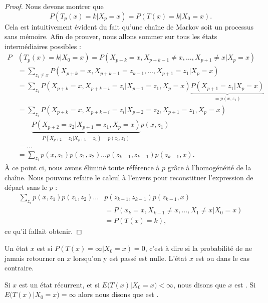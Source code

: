 \begin{proof}
    Nous devons montrer que 
    \begin{equation}
        P(T_p(x)=k|X_p=x)=P(T(x)=k|X_0=x).
    \end{equation}
    Cela est intuitivement évident du fait qu'une chaîne de Markov soit un processus sans mémoire. Afin de prouver, nous allons sommer sur tous les états intermédiaires possibles :
    \begin{subequations}
        \begin{align}
            P&(T_p(x)=k|X_0=x)=P(X_{p+k}=x,X_{p+k-1}\neq x,\ldots,X_{p+1}\neq x|X_p=x)\\
            &=\sum_{z_i\neq x}P(X_{p+k}=x,X_{p+k-1}=z_{k-1},\ldots,X_{p+1}=z_1|X_p=x)\\
            &=\sum_{z_i}P(X_{p+k}=x,X_{p+k-i}=z_i|X_{p+1}=z_1,X_p=x)\underbrace{P(X_{p+1}=z_1|X_p=x)}_{=p(x,z_1)}\\
            &=\sum_{z_i}P(X_{p+k}=x,X_{p+k-i}=z_i|X_{p+2}=z_2,X_{p+1}=z_1,X_p=x)\\
            &\qquad\underbrace{P(X_{p+2}=z_2|X_{p+1}=z_1,X_p=x)}_{P(X_{p+2}=z_2|X_{p+1}=z_1)=p(z_1,z_2)}p(x,z_1)\\
            &=\ldots\\
            &=\sum_{z_i}p(x,z_1)p(z_1,z_2)\ldots p(z_{k-1},z_{k-1})p(z_{k-1},x).
        \end{align}
    \end{subequations}
    À ce point ci, nous avons éliminé toute référence à \( p\) grâce à l'homogénéité de la chaîne. Nous pouvons refaire le calcul à l'envers pour reconstituer l'expression de départ sans le \( p\) :
    \begin{subequations}
        \begin{align}
         \sum_{z_i}p(x,z_1)p(z_1,z_2)\ldots &p(z_{k-1},z_{k-1})p(z_{k-1},x)\\
         &=P(x_k=x,X_{k-1}\neq x,\ldots,X_1\neq x|X_0=x)\\
         &=P(T(x)=k),
        \end{align}
    \end{subequations}
    ce qu'il fallait obtenir.
\end{proof}

\begin{definition}\label{DefWknULk}
    Un état \( x\) est  si \( P(T(x)=\infty|X_0=x)=0\), c'est à dire si la probabilité de ne jamais retourner en $x$ lorsqu'on y est passé est nulle. L'état \( x\) est  ou  dans le cas contraire.

    Si \( x\) est un état récurrent, et si \( E\big( T(x)|X_0=x \big)<\infty\), nous disons que \( x\) est . Si \( E\big( T(x)|X_0=x \big)=\infty\) alors nous disons que est .
\end{definition}

